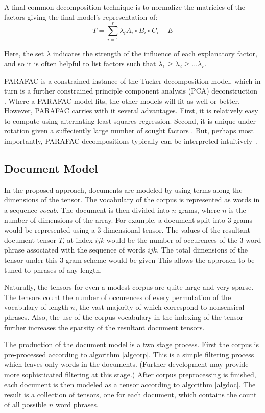 \documentclass{article}
\begin{document}
A final common decomposition technique is to normalize the matricies
of the factors giving the final model's representation of:
\begin{equation}
    \label{eq:parafac-lambda}
    T = \displaystyle\sum_{i=1}^{r} \lambda_i A_i \circ B_i \circ C_i
    + E
\end{equation}

Here, the set $\lambda$ indicates the strength of the influence of
each explanatory factor, and so it is often helpful to list factors
such that $\lambda_1 \geq \lambda_2 \geq \ldots \lambda_r$.

PARAFAC is a constrained instance of the Tucker decomposition model,
which in turn is a further constrained principle component analysis
(PCA) deconstruction \cite{bro1997}.  Where a PARAFAC model fits, the
other models will fit as well or better.  However, PARAFAC carries
with it several advantages.  First, it is relatively easy to compute
using alternating least squares regression.  Second, it is unique
under rotation given a suffeciently large number of sought factors
\cite{harshman1970}.  But, perhaps most importantly, PARAFAC
decompositions typically can be interpreted
intuitively~\cite{bro1997}.  

\subsection{Document Model}
In the proposed approach, documents are modeled by using terms along
the dimensions of the tensor.  The vocabulary of the corpus is
represented as words in a sequence $vocab$. 
The document is then divided into
$n$-grams, where $n$ is the number of dimensions of the array.  For
example, a document split into 3-grams would be represented using
a 3 dimensional tensor.  The values of the resultant document tensor
$T$, at index $ijk$ would be the number of occurences of the 3 word
phrase associated with the sequence of words $ijk$. The total
dimensions of the tensor under this 3-gram scheme would be given 
This allows the approach to be tuned to phrases of any length.  

Naturally, the tensors for even a modest corpus are quite large and
very sparse.  The tensors count the number of occurences of every
permutation of the vocabulary of length $n$, the vast majority of
which correspond to nonsensical phrases.  Also, the use of the corpus
vocabulary in the indexing of the tensor further increases the
sparsity of the resultant document tensors.

The production of the document model is a two stage process.  First
the corpus is pre-processed according to algorithm \ref{algcorp}.
This is a simple filtering process which leaves only words in the
documents.  (Further development may provide more sophisticated
filtering at this stage.)  After corpus preprocessing is finished,
each document is then modeled as a tensor according to algorithm
\ref{algdoc}.  The result is a collection of tensors, one for each
document, which contains the count of all possible $n$ word phrases.
\end{document}
